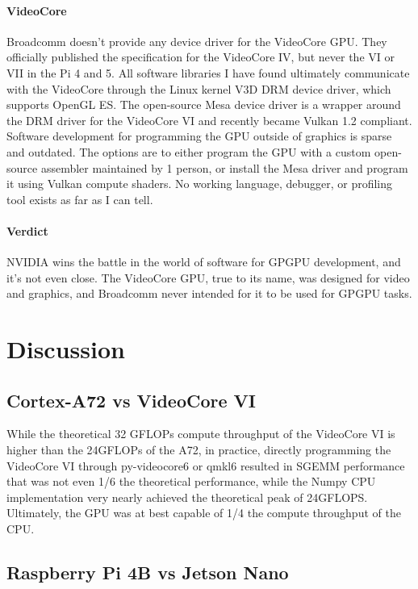 \documentclass[12pt]{article}
\begin{document}
\paragraph{VideoCore}
Broadcomm doesn't provide any device driver for the VideoCore GPU. They officially published the specification for the VideoCore IV, but never the VI or VII in the Pi 4 and 5. All software libraries I have found ultimately communicate with the VideoCore through the Linux kernel V3D DRM device driver, which supports OpenGL ES. The open-source Mesa device driver is a wrapper around the DRM driver for the VideoCore VI and recently became Vulkan 1.2 compliant. Software development for programming the GPU outside of graphics is sparse and outdated. The options are to either program the GPU with a custom open-source assembler maintained by 1 person, or install the Mesa driver and program it using Vulkan compute shaders. No working language, debugger, or profiling tool exists as far as I can tell.

\paragraph{Verdict}
NVIDIA wins the battle in the world of software for GPGPU development, and it's not even close. The VideoCore GPU, true to its name, was designed for video and graphics, and Broadcomm never intended for it to be used for GPGPU tasks.

\section{Discussion}\label{sec:discussion}
\subsection{Cortex-A72 vs VideoCore VI}
While the theoretical 32 GFLOPs compute throughput of the VideoCore VI is higher than the 24GFLOPs of the A72, in practice, directly programming the VideoCore VI through py-videocore6 or qmkl6 resulted in SGEMM performance that was not even 1/6 the theoretical performance, while the Numpy CPU implementation very nearly achieved the theoretical peak of 24GFLOPS. Ultimately, the GPU was at best capable of 1/4 the compute throughput of the CPU.

\subsection{Raspberry Pi 4B vs Jetson Nano}
\end{document}
